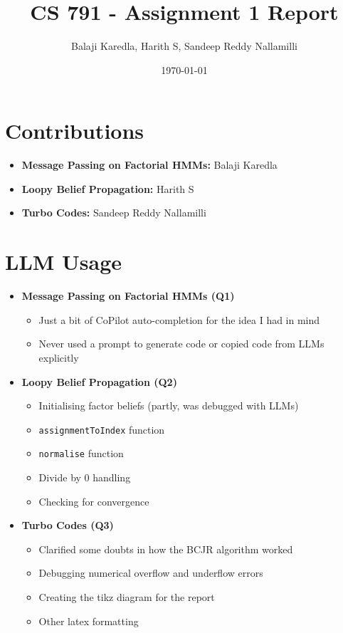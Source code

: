 \documentclass{paper}
\author{Balaji Karedla, Harith S, Sandeep Reddy Nallamilli}
\title{CS 791 - Assignment 1 Report}
\date{\today}
\begin{document}
\pagestyle{fancy}
\fancyhead{}
\fancyhead[R]{\thepage}

\maketitle

\tableofcontents

\pagebreak





\newpage
\section{Contributions}
\begin{itemize}
    \item \textbf{Message Passing on Factorial HMMs: } Balaji Karedla
    \item \textbf{Loopy Belief Propagation: } Harith S
    \item \textbf{Turbo Codes: } Sandeep Reddy Nallamilli
\end{itemize}

\section{LLM Usage}
\begin{itemize}
    \item \textbf{Message Passing on Factorial HMMs (Q1)}
    \begin{itemize}
        \item Just a bit of CoPilot auto-completion for the idea I had in mind
        \item Never used a prompt to generate code or copied code from LLMs explicitly
    \end{itemize}
    \item \textbf{Loopy Belief Propagation (Q2)}
    \begin{itemize}
        \item Initialising factor beliefs (partly, was debugged with LLMs)
        \item \texttt{assignmentToIndex} function
        \item \texttt{normalise} function
        \item Divide by 0 handling 
        \item Checking for convergence
    \end{itemize}
    \item \textbf{Turbo Codes (Q3)}
    \begin{itemize}
        \item Clarified some doubts in how the BCJR algorithm worked
        \item Debugging numerical overflow and underflow errors
        \item Creating the tikz diagram for the report
        \item Other latex formatting
    \end{itemize}
\end{itemize}
\end{document}
